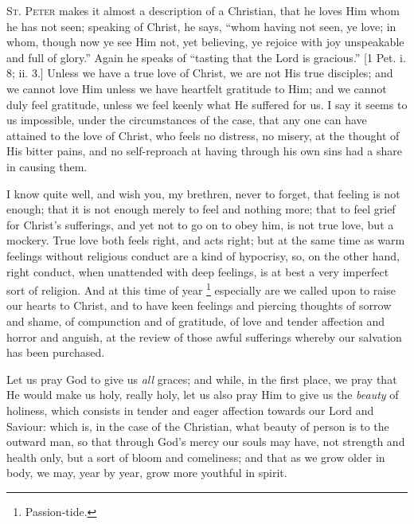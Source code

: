 S\textsc{t}. P\textsc{eter} makes it almost a description of a Christian, that he
loves Him whom he has not seen; speaking of Christ, he says,
``whom having not seen, ye love; in whom, though now ye see Him
not, yet believing, ye rejoice with joy unspeakable and full of
glory.'' Again he speaks of ``tasting that the Lord is
gracious.'' [1 Pet. i. 8; ii. 3.] Unless we have a true love of
Christ, we are not His true disciples; and we cannot love Him unless
we have heartfelt gratitude to Him; and we cannot duly feel gratitude,
unless we feel keenly what He suffered for us. I say it seems to us
impossible, under the circumstances of the case, that any one can have
attained to the love of Christ, who feels no distress, no misery, at
the thought of His bitter pains, and no self-reproach at having
through his own sins had a share in causing them.

I know quite well, and wish you, my brethren, never to forget, that
feeling is not enough; that it is not enough merely to feel and
nothing more; that to feel grief for Christ's sufferings, and yet not
to go on to obey him, is not true love, but a mockery. True love both
feels right, and acts right; but at the same time as warm feelings
without religious conduct are a kind of hypocrisy, so, on the other
hand, right conduct, when unattended with deep feelings, is at best a
very imperfect sort of religion. And at this time of year \footnote{Passion-tide.}
especially are we called upon to raise our hearts to Christ, and to
have keen feelings and piercing thoughts of sorrow and shame, of
compunction and of gratitude, of love and tender affection and horror
and anguish, at the review of those awful sufferings whereby our
salvation has been purchased.

Let us pray God to give us \emph{all} graces; and while, in the
first place, we pray that He would make us holy, really holy, let us
also pray Him to give us the \emph{beauty} of holiness, which consists
in tender and eager affection towards our Lord and Saviour: which is,
in the case of the Christian, what beauty of person is to the outward
man, so that through God's mercy our souls may have, not strength and
health only, but a sort of bloom and comeliness; and that as we grow
older in body, we may, year by year, grow more youthful in spirit.

